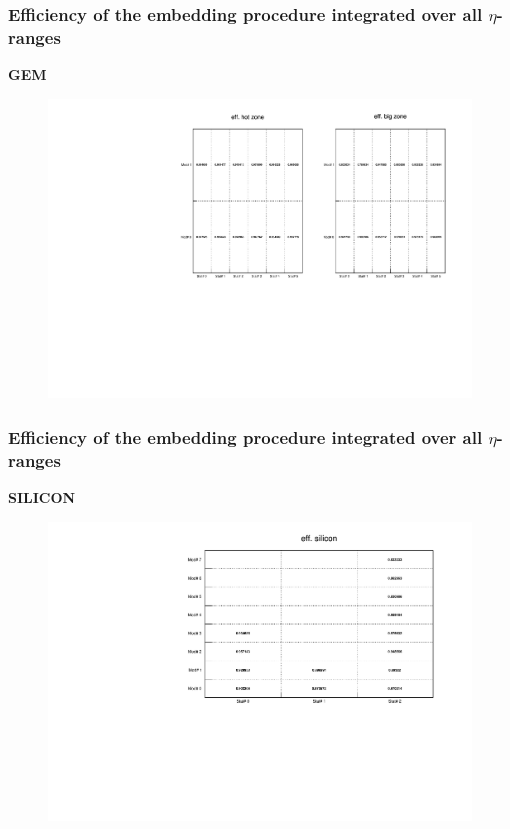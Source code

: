 \documentclass[dvipsnames] {beamer}
\begin{document}
         \begin{frame}
           \bf
           \vskip -0.25cm
           \frametitle{\bf \centering \footnotesize Efficiency of the embedding procedure integrated over all $\eta$-ranges}
           \begin{block}{\bf \centering GEM}
             \begin{figure}[H]
               \includegraphics[width=1.\linewidth]{gemEmbHitEff_allRanges.pdf}
             \end{figure}
           \end{block}
         \end{frame}

          \begin{frame}
           \bf
           \vskip -0.25cm
           \frametitle{\bf \centering \footnotesize Efficiency of the embedding procedure integrated over all $\eta$-ranges}
           \begin{block}{\bf \centering SILICON}
             \begin{figure}[H]
               \includegraphics[width=1.\linewidth]{silEmbHitEff_allRanges.pdf}
             \end{figure}
           \end{block}
         \end{frame}
\end{document}
